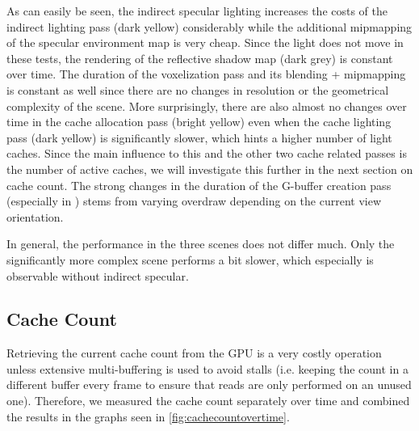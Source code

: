 \documentclass[thesis.tex]{subfiles}
\begin{document}
As can easily be seen, the indirect specular lighting increases the costs of the indirect lighting pass (dark yellow) considerably while the additional mipmapping of the specular environment map is very cheap.
Since the light does not move in these tests, the rendering of the reflective shadow map (dark grey) is constant over time.
The duration of the voxelization pass and its blending + mipmapping is constant as well since there are no changes in resolution or the geometrical complexity of the scene.
More surprisingly, there are also almost no changes over time in the cache allocation pass (bright yellow) even when the cache lighting pass (dark yellow) is significantly slower, which hints a higher number of light caches.
Since the main influence to this and the other two cache related passes is the number of active caches, we will investigate this further in the next section on cache count. 
The strong changes in the duration of the G-buffer creation pass (especially in ) stems from varying overdraw depending on the current view orientation.

In general, the performance in the three scenes does not differ much.
Only the significantly more complex  scene performs a bit slower, which especially is observable without indirect specular.

\subsection{Cache Count}
Retrieving the current cache count from the GPU is a very costly operation unless extensive multi-buffering is used to avoid stalls (i.e. keeping the count in a different buffer every frame to ensure that reads are only performed on an unused one).
Therefore, we measured the cache count separately over time and combined the results in the graphs seen in \autoref{fig:cachecountovertime}.
\end{document}
